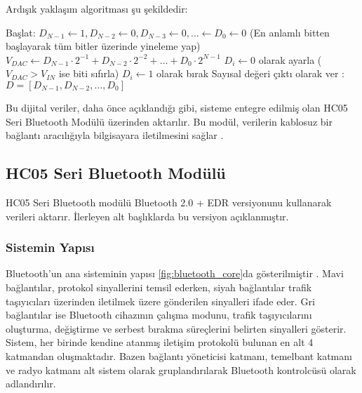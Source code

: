 \newpage

Ardışık yaklaşım algoritması şu şekildedir:

\begin{tcolorbox}[colback=white, colframe=black, title={Ardışık Yaklaşım Algoritması}]
\begin{algorithmic}
\State Başlat: \(D_{N-1} \gets 1, D_{N-2} \gets 0, D_{N-3} \gets 0, \dots \gets D_0 \gets 0\)
 (En anlamlı bitten başlayarak tüm bitler üzerinde yineleme yap)
    \State $V_{DAC} \gets D_{N-1} \cdot 2^{-1} + D_{N-2} \cdot 2^{-2} + \dots + D_{0} \cdot 2^{N-1}$
        \State \(D_i \gets 0\) olarak ayarla (\(V_{DAC} > V_{IN}\) ise biti sıfırla)
    \Else
        \State \(D_i \gets 1\) olarak bırak
    \EndIf
\EndFor
\State Sayısal değeri çıktı olarak ver : \(D = [D_{N-1}, D_{N-2}, \dots, D_0]\)
\end{algorithmic}
\end{tcolorbox}


Bu dijital veriler, daha önce açıklandığı gibi, sisteme entegre edilmiş olan HC05 Seri Bluetooth Modülü üzerinden aktarılır. Bu modül, verilerin kablosuz bir bağlantı aracılığıyla bilgisayara iletilmesini sağlar \cite{CMOS_SAR}. 


\subsection{HC05 Seri Bluetooth Modülü}

HC05 Seri Bluetooth modülü Bluetooth 2.0 + EDR versiyonunu kullanarak verileri aktarır. İlerleyen alt başlıklarda bu versiyon açıklanmıştır.

\subsubsection{Sistemin Yapısı}


Bluetooth'un ana sisteminin yapısı \ref{fig:bluetooth_core}da gösterilmiştir \cite{bluetooth2007core}. Mavi bağlantılar, protokol sinyallerini temsil ederken, siyah bağlantılar trafik taşıyıcıları üzerinden iletilmek üzere gönderilen sinyalleri ifade eder. Gri bağlantılar ise Bluetooth cihazının çalışma modunu, trafik taşıyıcılarını oluşturma, değiştirme ve serbest bırakma süreçlerini belirten sinyalleri gösterir. Sistem, her birinde kendine atanmış iletişim protokolü bulunan en alt 4 katmandan oluşmaktadır. Bazen bağlantı yöneticisi katmanı, temelbant katmanı ve radyo katmanı alt sistem olarak gruplandırılarak Bluetooth kontrolcüsü olarak adlandırılır. 


